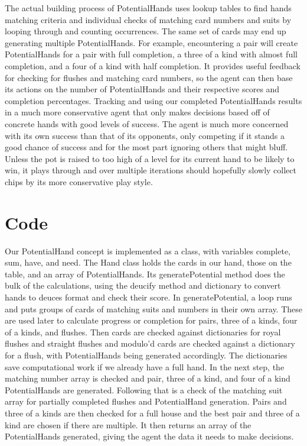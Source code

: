 \documentclass[10pt, a4paper, twocolumn]{article} %
\begin{document}
	The actual building process of PotentialHands uses lookup tables to find hands matching criteria and individual checks of matching card numbers and suits by looping through and counting occurrences. The same set of cards may end up generating multiple PotentialHands. For example, encountering a pair will create PotentialHands for a pair with full completion, a three of a kind with almost full completion, and a four of a kind with half completion. It provides useful feedback for checking for flushes and matching card numbers, so the agent can then base its actions on the number of PotentialHands and their respective scores and completion percentages. Tracking and using our completed PotentialHands results in a much more conservative agent that only makes decisions based off of concrete hands with good levels of success. The agent is much more concerned with its own success than that of its opponents, only competing if it stands a good chance of success and for the most part ignoring others that might bluff. Unless the pot is raised to too high of a level for its current hand to be likely to win, it plays through and over multiple iterations should hopefully slowly collect chips by its more conservative play style.



\section{Code}
Our PotentialHand concept is implemented as a class, with variables complete, sum, have, and need. The Hand class holds the cards in our hand, those on the table, and an array of PotentialHands. Its generatePotential method does the bulk of the calculations, using the deucify method and dictionary to convert hands to deuces format and check their score. In generatePotential, a loop runs and puts groups of cards of matching suits and numbers in their own array. These are used later to calculate progress or completion for pairs, three of a kinds, four of a kinds, and flushes. Then cards are checked against dictionaries for royal flushes and straight flushes and modulo’d cards are checked against a dictionary for a flush, with PotentialHands being generated accordingly. The dictionaries save computational work if we already have a full hand. In the next step, the matching number array is checked and pair, three of a kind, and four of a kind PotentialHands are generated. Following that is a check of the matching suit array for partially completed flushes and PotentialHand generation. Pairs and three of a kinds are then checked for a full house and the best pair and three of a kind are chosen if there are multiple. It then returns an array of the PotentialHands generated, giving the agent the data it needs to make decisions.
\end{document}
